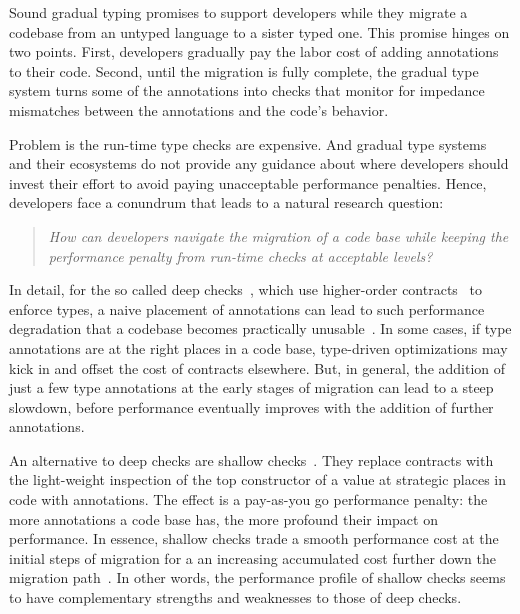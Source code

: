  Sound gradual typing promises to support developers while they migrate a
 codebase from an untyped language to a sister typed one.  This promise
 hinges on two points. First, developers  gradually pay the labor cost of 
 adding annotations to their code.  Second, until the
 migration is fully complete, the gradual type system turns some of the
 annotations into checks that monitor for impedance mismatches between the
 annotations and the code's behavior.

 Problem is the run-time type checks are expensive.  And gradual type
 systems and their ecosystems do not provide any guidance about where
 developers should invest their effort to avoid paying unacceptable
 performance penalties. Hence, developers face a
 conundrum that leads to a natural research question:
 \begin{quote}
 \em How can developers navigate the migration of a code base while keeping
 the performance penalty from run-time checks at acceptable
 levels?\end{quote}  


 In detail, for the so called deep
 checks~\cite{tf-dls-2006,tf-popl-2008,st-sfp-2006}, which use
 higher-order contracts~\cite{ff-icfp-2002} to enforce types, a naive
 placement of annotations can lead to such performance degradation that a
 codebase becomes practically
 unusable~\cite{tfgnvf-popl-2016,gtnffvf-jfp-2019}.  In some cases, if
 type annotations are at the right places in a code base, type-driven
 optimizations may kick in and offset the cost of  contracts elsewhere.  
 But, in general, the addition of just a few type annotations
 at the early stages of migration can lead to a steep slowdown,
 before performance eventually improves  with the addition of further
 annotations. 

 An alternative to deep checks are shallow
 checks~\cite{vss-popl-2017,vksb-dls-2014,v-thesis-2019}. They replace
 contracts with the light-weight inspection of the top constructor of a
 value at strategic places in code with annotations.  The effect is a
 pay-as-you go performance penalty: the more annotations a code base has,
 the more profound their impact on performance. In essence, shallow checks
 trade a smooth performance cost at the initial steps of migration for a
 an increasing accumulated cost further down the
 migration path~\cite{gm-pepm-2018,rmhn-ecoop-2019}.  In other words, the
 performance profile of shallow checks seems to have complementary
 strengths and weaknesses to those of deep checks.  

